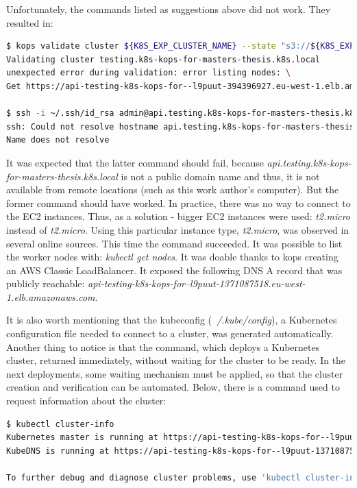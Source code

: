 Unfortunately, the commands listed as suggestions above did not work. They resulted in:
\begin{lstlisting}[basicstyle=\tiny,caption={Commands run in attempt to connect with a cluster created by Kops together with returned output},captionpos=b,language=Bash,xleftmargin=1cm]
$ kops validate cluster ${K8S_EXP_CLUSTER_NAME} --state "s3://${K8S_EXP_KOPS_S3_BUCKET}"
Validating cluster testing.k8s-kops-for-masters-thesis.k8s.local
unexpected error during validation: error listing nodes: \
Get https://api-testing-k8s-kops-for--l9puut-394396927.eu-west-1.elb.amazonaws.com/api/v1/nodes: EOF

$ ssh -i ~/.ssh/id_rsa admin@api.testing.k8s-kops-for-masters-thesis.k8s.local
ssh: Could not resolve hostname api.testing.k8s-kops-for-masters-thesis.k8s.local: \
Name does not resolve
\end{lstlisting}

It was expected that the latter command should fail, because \textit{api.testing.k8s-kops-for-masters-thesis.k8s.local} is not a public domain name and thus, it is not available from remote locations (such as this work author's computer). But the former command should have worked. In practice, there was no way to connect to the EC2 instances. Thus, as a solution - bigger EC2 instances were used: \textit{t2.micro} instead of \textit{t2.micro}. Using this particular instance type, \textit{t2.micro}, was observed in several online sources\cite{online-ha-k8s-blog}\cite{online-perfect-k8s-blog}\cite{online-kops-sa}. This time the command succeeded. It was possible to list the worker nodes with: \textit{kubectl get nodes}. It was doable thanks to kops creating an AWS Classic LoadBalancer. It exposed the following DNS A record that was publicly reachable: \textit{api-testing-k8s-kops-for--l9puut-1371087518.eu-west-1.elb.amazonaws.com}.

It is also worth mentioning that the kubeconfig (\textit{~/.kube/config}), a Kubernetes configuration file needed to connect to a cluster, was generated automatically. Another thing to notice is that the command, which deploys a Kubernetes cluster, returned immediately, without waiting for the cluster to be ready. In the next deployments, some waiting mechanism must be applied, so that the cluster creation and verification can be automated. Below, there is a command used to request information about the cluster:
\begin{lstlisting}[basicstyle=\tiny,caption={Command used to request information about a running Kubernetes cluster},captionpos=b,language=Bash,xleftmargin=1cm]
$ kubectl cluster-info
Kubernetes master is running at https://api-testing-k8s-kops-for--l9puut-1371087518.eu-west-1.elb.amazonaws.com
KubeDNS is running at https://api-testing-k8s-kops-for--l9puut-1371087518.eu-west-1.elb.amazonaws.com/api/v1/namespaces/kube-system/services/kube-dns:dns/proxy

To further debug and diagnose cluster problems, use 'kubectl cluster-info dump'.
\end{lstlisting}

